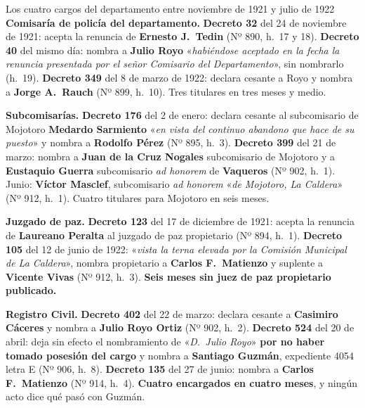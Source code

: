 \begin{ficha}{Los cuatro cargos del departamento entre noviembre de 1921 y julio de 1922}
\textbf{Comisaría de policía del departamento.} \textbf{Decreto 32} del 24 de noviembre de 1921:
acepta la renuncia de \textbf{Ernesto J.\ Tedin} (Nº 890, h.\ 17 y 18). \textbf{Decreto 40} del
mismo día: nombra a \textbf{Julio Royo} «\textit{habiéndose aceptado en la fecha la renuncia
presentada por el señor Comisario del Departamento}», sin nombrarlo (h.\ 19). \textbf{Decreto 349}
del 8 de marzo de 1922: declara cesante a Royo y nombra a \textbf{Jorge A.\ Rauch} (Nº 899,
h.\ 10). Tres titulares en tres meses y medio.

\textbf{Subcomisarías.} \textbf{Decreto 176} del 2 de enero: declara cesante al subcomisario de
Mojotoro \textbf{Medardo Sarmiento} «\textit{en vista del continuo abandono que hace de su
puesto}» y nombra a \textbf{Rodolfo Pérez} (Nº 895, h.\ 3). \textbf{Decreto 399} del 21 de marzo:
nombra a \textbf{Juan de la Cruz Nogales} subcomisario de Mojotoro y a \textbf{Eustaquio Guerra}
subcomisario \textit{ad honorem} de \textbf{Vaqueros} (Nº 902, h.\ 1). Junio: \textbf{Víctor
Masclef}, subcomisario \textit{ad honorem} «\textit{de Mojotoro, La Caldera}» (Nº 912, h.\ 1).
Cuatro titulares para Mojotoro en seis meses.

\textbf{Juzgado de paz.} \textbf{Decreto 123} del 17 de diciembre de 1921: acepta la renuncia de
\textbf{Laureano Peralta} al juzgado de paz propietario (Nº 894, h.\ 1). \textbf{Decreto 105} del
12 de junio de 1922: «\textit{vista la terna elevada por la Comisión Municipal de La Caldera}»,
nombra propietario a \textbf{Carlos F.\ Matienzo} y suplente a \textbf{Vicente Vivas} (Nº 912,
h.\ 3). \textbf{Seis meses sin juez de paz propietario publicado.}

\textbf{Registro Civil.} \textbf{Decreto 402} del 22 de marzo: declara cesante a \textbf{Casimiro
Cáceres} y nombra a \textbf{Julio Royo Ortiz} (Nº 902, h.\ 2). \textbf{Decreto 524} del 20 de
abril: deja sin efecto el nombramiento de «\textit{D.\ Julio Royo}» \textbf{por no haber tomado
posesión del cargo} y nombra a \textbf{Santiago Guzmán}, expediente 4054 letra E (Nº 906, h.\ 8).
\textbf{Decreto 135} del 27 de junio: nombra a \textbf{Carlos F.\ Matienzo} (Nº 914, h.\ 4).
\textbf{Cuatro encargados en cuatro meses}, y ningún acto dice qué pasó con Guzmán.
\end{ficha}

